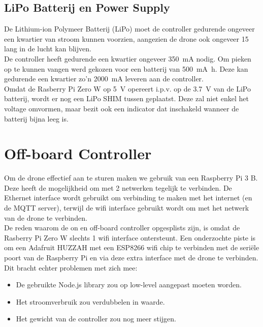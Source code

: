 \subsection{LiPo Batterij en Power Supply} \label{sec:lipo}
De Lithium-ion Polymeer Batterij (LiPo) moet de controller gedurende ongeveer een kwartier van stroom kunnen voorzien, aangezien de drone ook ongeveer \SI{15}{\min} lang in de lucht kan blijven.\\
De controller heeft gedurende een kwartier ongeveer \SI{350}{\mA} nodig.
Om pieken op te kunnen vangen werd gekozen voor een batterij van \SI{500}{\mA\hour}.
Deze kan gedurende een kwartier zo'n \SI{2000}{\mA} leveren aan de controller.\\

Omdat de Rasberry Pi Zero W op \SI{5}{\V} opereert i.p.v. op de \SI{3.7}{\V} van de LiPo batterij, wordt er nog een LiPo SHIM tussen geplaatst.
Deze zal niet enkel het voltage omvormen, maar bezit ook een indicator dat inschakeld wanneer de batterij bijna leeg is.

\section{Off-board Controller} \label{sec:offboard_controller}
Om de drone effectief aan te sturen maken we gebruik van een Raspberry Pi 3 B.
Deze heeft de mogelijkheid om met 2 netwerken tegelijk te verbinden. De Ethernet interface wordt gebruikt om verbinding te maken met het internet (en de MQTT server), terwijl de wifi interface gebruikt wordt om met het netwerk van de drone te verbinden.\\

De reden waarom de on en off-board controller opgesplists zijn, is omdat de Rasberry Pi Zero W slechts 1 wifi interface ontersteunt.
Een onderzochte piste is om een Adafruit HUZZAH met een ESP8266 wifi chip te verbinden met de seri\"ele poort van de Raspberry Pi en via deze extra interface met de drone te verbinden.\\
Dit bracht echter problemen met zich mee:
\begin{itemize}
	\item De gebruikte Node.js library zou op low-level aangepast moeten worden.
	\item Het stroomverbruik zou verdubbelen in waarde.
	\item Het gewicht van de controller zou nog meer stijgen.
\end{itemize}


